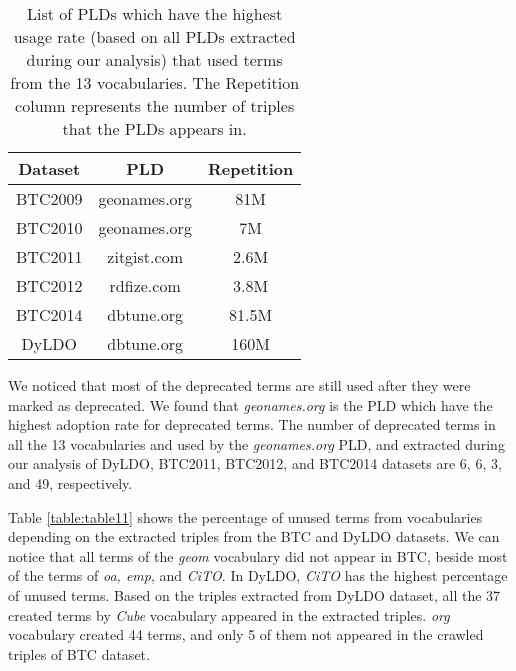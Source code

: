 \begin{table}
	\centering
	\caption{List of PLDs which have the highest usage rate (based on all PLDs extracted during our analysis) that used terms from the 13 vocabularies. The Repetition column represents the number of triples that the PLDs appears in.}
	\label{table:table9}
	\begin{tabular}{ccc}
		\toprule
		Dataset & PLD & Repetition\\
		\midrule 
		BTC2009 & geonames.org & 81M\\
		
		BTC2010 & geonames.org & 7M\\
		
		BTC2011 & zitgist.com & 2.6M\\
		
		BTC2012 & rdfize.com & 3.8M\\
		
		BTC2014 & dbtune.org & 81.5M\\
		
		DyLDO & dbtune.org & 160M\\
		
		\bottomrule
	\end{tabular}
\end{table}

We noticed that most of the deprecated terms are still used after they were marked as deprecated. We found that \textit{geonames.org} is the PLD which have the highest adoption rate for deprecated terms. 
The number of deprecated terms in all the 13 vocabularies and used by the \textit{geonames.org} PLD, and extracted during our analysis of DyLDO, BTC2011, BTC2012, and BTC2014 datasets are 6, 6, 3, and 49, respectively.

Table \ref{table:table11} shows the percentage of unused terms from vocabularies depending on the extracted triples from the BTC and DyLDO datasets. We can notice that all terms of the \textit{geom} vocabulary did not appear in BTC, beside most of the terms of \textit{oa, emp}, and \textit{CiTO}. In DyLDO, \textit{CiTO} has the highest percentage of unused terms.
Based on the triples extracted from DyLDO dataset, all the 37 created terms by \textit{Cube} vocabulary appeared in the extracted triples. \textit{org} vocabulary created 44 terms, and only 5 of them not appeared in the crawled triples of BTC dataset.

